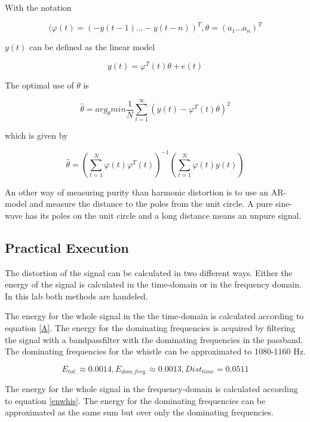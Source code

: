 \documentclass[12pt]{article}
\begin{document}
With the notation

\begin{equation}
(\varphi(t) =(-y(t-1) ... -y(t-n))^T,\theta = (a_1 ... a_n)^T 
\end{equation}

$y(t)$ can be defined as the linear model

\begin{equation}
y(t)=\varphi^T(t)\theta+ e(t)
\end{equation}

The optimal use of $\theta$ is

\begin{equation}
\hat{\theta}=arg_{\theta}min \frac{1}{N}\sum_{t=1}^{\infty}(y(t)-\varphi^T(t)\theta)^2
\end{equation}

which is given by

\begin{equation}
\hat{\theta}=\left(\sum_{t=1}^N\varphi(t)\varphi^T(t)\right)^{-1}\left(\sum_{t=1}^N\varphi(t)y(t)\right)
\label{enwhis}
\end{equation}

An other way of measuring purity than harmonic distortion is to use an AR-model and measure the distance to the poles from the unit circle. A pure sine-wave has its poles on the unit circle and a long distance means an unpure signal.


\subsection{Practical Execution}
The distortion of the signal can be calculated in two different ways. Either the energy of the signal is calculated in the time-domain or in the frequency domain. In this lab both methods are handeled.

The energy for the whole signal in the the time-domain is calculated according to equation \ref{A}. The energy for the dominating frequencies is acquired by filtering the signal with a bandpassfilter with the dominating frequencies in the passband. The dominating frequencies for the whistle can be approximated to 1080-1160 Hz. 

\begin{equation}
E_{tot.} \approx 0.0014, E_{dom. freq.}\approx 0.0013, Dist_{time} = 0.0511
\end{equation}

The energy for the whole signal in the frequency-domain is calculated according to equation \ref{enwhis}. The energy for the dominating frequencies can be approximated as the same sum but over only the dominating frequencies. 
\end{document}
